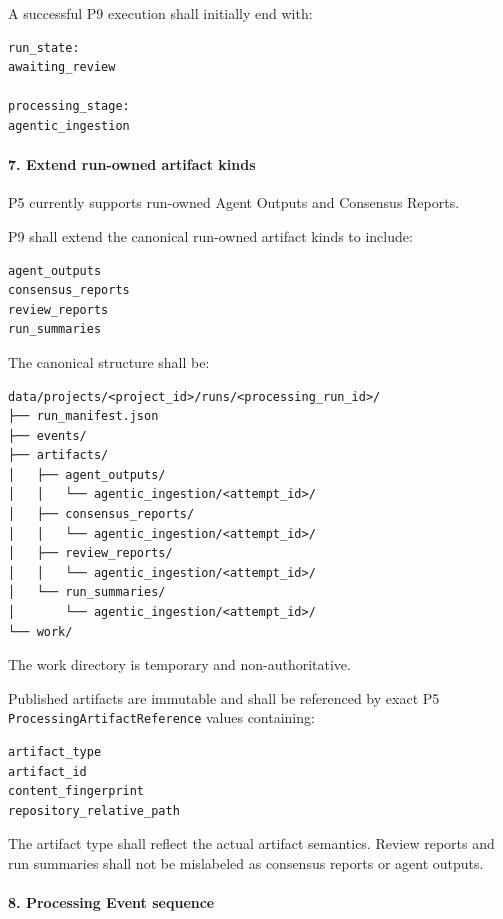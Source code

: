 A successful P9 execution shall initially end with:

\begin{verbatim}
run_state:
awaiting_review

processing_stage:
agentic_ingestion
\end{verbatim}

\hypertarget{7-extend-run-owned-artifact-kinds}{%
\paragraph{7. Extend run-owned artifact kinds}\label{7-extend-run-owned-artifact-kinds}}

P5 currently supports run-owned Agent Outputs and Consensus Reports.

P9 shall extend the canonical run-owned artifact kinds to include:

\begin{verbatim}
agent_outputs
consensus_reports
review_reports
run_summaries
\end{verbatim}

The canonical structure shall be:

\begin{verbatim}
data/projects/<project_id>/runs/<processing_run_id>/
├── run_manifest.json
├── events/
├── artifacts/
│   ├── agent_outputs/
│   │   └── agentic_ingestion/<attempt_id>/
│   ├── consensus_reports/
│   │   └── agentic_ingestion/<attempt_id>/
│   ├── review_reports/
│   │   └── agentic_ingestion/<attempt_id>/
│   └── run_summaries/
│       └── agentic_ingestion/<attempt_id>/
└── work/
\end{verbatim}

The work directory is temporary and non-authoritative.

Published artifacts are immutable and shall be referenced by exact P5 \texttt{ProcessingArtifactReference} values containing:

\begin{verbatim}
artifact_type
artifact_id
content_fingerprint
repository_relative_path
\end{verbatim}

The artifact type shall reflect the actual artifact semantics. Review reports and run summaries shall not be mislabeled as consensus reports or agent outputs.

\hypertarget{8-processing-event-sequence}{%
\paragraph{8. Processing Event sequence}\label{8-processing-event-sequence}}

